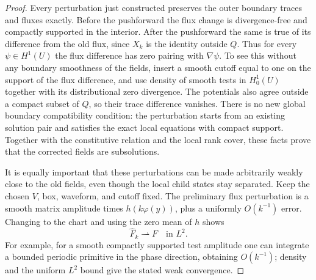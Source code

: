\begin{proof}
Every perturbation just constructed preserves the outer boundary
traces and fluxes exactly. Before the pushforward the flux change
is divergence-free and compactly supported in the interior. After
the pushforward the same is true of its difference from the old
flux, since $X_k$ is the identity outside $Q$. Thus for every
$\psi\in H^1(U)$ the flux difference has zero pairing with
$\nabla\psi$. To see this without any boundary smoothness of the
fields, insert a smooth cutoff equal to one on the support of the
flux difference, and use density of smooth tests in $H^1_0(U)$ together
with its distributional zero divergence. The potentials also agree
outside a compact subset of $Q$, so their trace difference vanishes.
There is no new global boundary compatibility
condition: the perturbation starts from an existing solution pair
and satisfies the exact local equations with compact support.
Together with the constitutive relation and the local rank cover, these
facts prove that the corrected fields are subsolutions.

It is equally important that these perturbations can be made
arbitrarily weakly close to the old fields, even though the local
child states stay separated. Keep the chosen $V$, box, waveform,
and cutoff fixed. The preliminary flux
perturbation is a smooth matrix amplitude times
$h(k\varphi(y))$, plus a uniformly $O(k^{-1})$ error.
Changing to the chart and using the zero mean of $h$ shows
\begin{equation}
 \label{sc:preliminary-weak-limit}
 \widehat F_k\rightharpoonup F\quad\text{in }L^2.
\end{equation}
For example, for a smooth compactly supported test amplitude one
can integrate a bounded periodic primitive in the phase direction,
obtaining $O(k^{-1})$; density and the uniform $L^2$ bound give
the stated weak convergence.


\end{proof}

